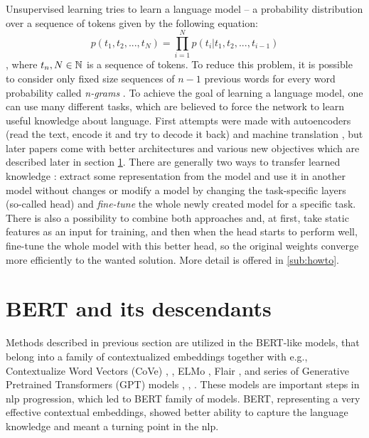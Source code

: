 \par
Unsupervised learning tries to learn a language model -- a probability distribution over a sequence of tokens given by the following equation:
 \begin{equation*}
  p(t_1, t_2,...,t_N) =\prod_{i=1}^{N} p(t_i | t_1, t_2, ..., t_{i-1})
\end{equation*}\citep{Liu2020}, where $t_n, N \in \mathbb{N}$ is a sequence of tokens. To reduce this problem, it is possible to consider only fixed size sequences of $n-1$ previous words for every word probability called \textit{n-grams} \citep{Bengio2003}. To achieve the goal of learning a language model, one can use many different tasks, which are believed to force the network to learn useful knowledge about language. First attempts were made with autoencoders (read the text, encode it and try to decode it back) \citep{Dai2015} and machine translation \citep{Ramachandran2017}, but later papers come with better architectures and various new objectives which are described later in section \ref{sec:bert}.  There are generally two ways to transfer learned knowledge \citep{Feijo2020}: extract some representation from the model and use it in another model without changes or modify a model by changing the task-specific layers (so-called head) and \textit{fine-tune} the whole newly created model for a specific task. There is also a possibility to combine both approaches and, at first, take static features as an input for training, and then when the head starts to perform well, fine-tune the whole model with this better head, so the original weights converge more efficiently to the wanted solution. More detail is offered in \ref{sub:howto}.
\section{BERT and its descendants}
\label{sec:bert}
Methods described in previous section
are utilized in the BERT-like models, that belong into a family of contextualized embeddings together with e.g., Contextualize Word Vectors (CoVe) \citep{McCann2017}, \citep{Peters2017}, ELMo \citep{Peters2018}, Flair \citep{Akbik2018}, and series of Generative Pretrained Transformers (GPT) models \citep{Radfort2018}, \citep{RadfordAlec2019}, \citep{Brown2020}. These models are important steps in \acrshort{nlp} progression, which led to BERT family of models. BERT, representing a very effective contextual %
 embeddings, showed better ability to capture the language knowledge and meant a turning point in the \acrshort{nlp}.
